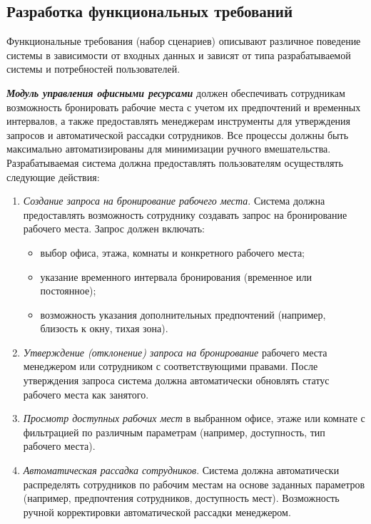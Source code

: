 \subsection{Разработка функциональных требований}
\label{sec:tech-requirements:functional-requirements}

Функциональные требования (набор сценариев) описывают различное поведение системы в зависимости от входных данных и зависят от типа разрабатываемой системы и
потребностей пользователей.


\textit{\textbf{Модуль управления офисными ресурсами}} должен обеспечивать сотрудникам возможность бронировать рабочие места с учетом их предпочтений и временных интервалов, а также предоставлять менеджерам инструменты для утверждения запросов и автоматической рассадки сотрудников. Все процессы должны быть максимально автоматизированы для минимизации ручного вмешательства. Разрабатываемая система должна предоставлять пользователям осуществлять следующие действия:

\begin{enumerate}
    \item \textit{Создание запроса на бронирование рабочего места}. Система должна предоставлять возможность сотруднику создавать запрос на бронирование рабочего места. Запрос должен включать:
        \begin{itemize}
            \item выбор офиса, этажа, комнаты и конкретного рабочего места;
            \item указание временного интервала бронирования (временное или постоянное);
            \item возможность указания дополнительных предпочтений (например, близость к окну, тихая зона).
        \end{itemize}

    \item \textit{Утверждение (отклонение) запроса на бронирование} рабочего места менеджером или сотрудником с соответствующими правами. После утверждения запроса система должна автоматически обновлять статус рабочего места как занятого.

    \item \textit{Просмотр доступных рабочих мест} в выбранном офисе, этаже или комнате с фильтрацией по различным параметрам (например, доступность, тип рабочего места).

    \item \textit{Автоматическая рассадка сотрудников}. Система должна автоматически распределять сотрудников по рабочим местам на основе заданных параметров (например, предпочтения сотрудников, доступность мест). Возможность ручной корректировки автоматической рассадки менеджером.
\end{enumerate}

